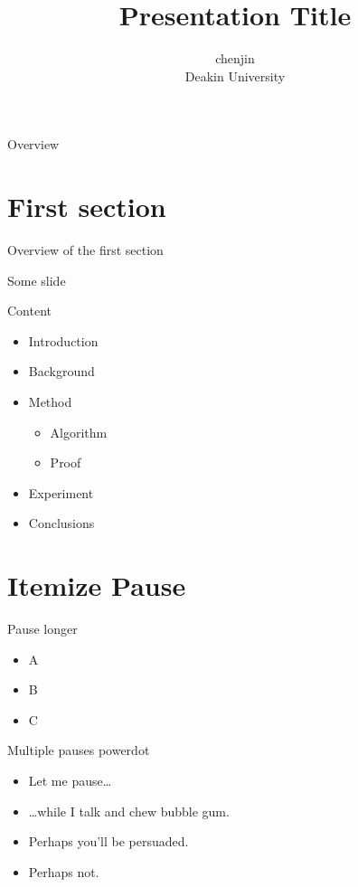 \documentclass[
 size=12pt,
 paper=smartboard, %
 mode=present, %
 display=slides, %
style=tuliplab,
pauseslide,
fleqn,leqno]{powerdot}
\title{Presentation Title}
\author{chenjin
\\
Deakin University 
}
\date{\gitCommitterDate}
\begin{document}
\maketitle 

\begin{slide}[toc=,bm=]{Overview}
\tableofcontents[content=sections]
\end{slide}
\section{First section}
\begin{slide}[toc=,bm=]{Overview of the first section}
\tableofcontents[content=currentsection,type=1]
\end{slide}
\begin{slide}{Some slide}
\end{slide}

\begin{slide}{Content}
  \begin{itemize}
    \item Introduction\pause
    \item Background
    \item Method \pause
      \begin{itemize}
      \item Algorithm
      \item Proof
      \end{itemize}
    \item Experiment
    \item Conclusions
  \end{itemize}
\end{slide}


\section{Itemize Pause}


\begin{slide}{Pause longer}
\begin{itemize}
\item A \pause
\item B \pause[2]
\item C
\end{itemize}
\end{slide}


\begin{slide}{Multiple pauses}
power\pause dot \pause
\begin{itemize}
\item Let me pause\ldots \pause
\item \ldots while I talk \pause and chew bubble gum. \pause
\item Perhaps you’ll be persuaded.
\item Perhaps not.
\end{itemize}
\end{slide}
\end{document}
